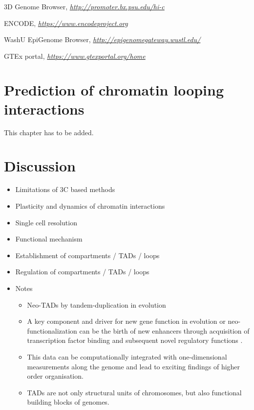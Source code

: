 \documentclass[a4paper,twoside=true,openright,parskip=full,chapterprefix=true,11pt,headings=normal,bibliography=totoc,listof=totoc,titlepage=on,captions=tableabove,draft=false]{scrreprt}
\providecommand{\tightlist}{%
  \setlength{\itemsep}{0pt}\setlength{\parskip}{0pt}}
\theoremstyle{definition}
\theoremstyle{definition}
\theoremstyle{definition}
\theoremstyle{remark}
\begin{document}
3D Genome Browser,
\href{http://promoter.bx.psu.edu/hi-c}{\emph{http://promoter.bx.psu.edu/hi-c}}

ENCODE,
\href{https://www.encodeproject.org/}{\emph{https://www.encodeproject.org}}

WashU EpiGenome Browser,
\href{http://epigenomegateway.wustl.edu/}{\emph{http://epigenomegateway.wustl.edu/}}

GTEx portal,
\href{https://www.gtexportal.org/home}{\emph{https://www.gtexportal.org/home}}

\chapter{Prediction of chromatin looping
interactions}\label{loop-prediction}

This chapter has to be added.

\chapter{Discussion}\label{thesis-discussion}

\begin{itemize}
\item
  Limitations of 3C based methods
\item
  Plasticity and dynamics of chromatin interactions
\item
  Single cell resolution
\item
  Functional mechanism
\item
  Establishment of compartments / TADs / loops
\item
  Regulation of compartments / TADs / loops
\item
  Notes

  \begin{itemize}
  \tightlist
  \item
    Neo-TADs by tandem-duplication in evolution \citep{Franke2016}
  \item
    A key component and driver for new gene function in evolution or
    neo-functionalization can be the birth of new enhancers through
    acquisition of transcription factor binding and subsequent novel
    regulatory functions \citep{Long2016}.
  \item
    This data can be computationally integrated with one-dimensional
    measurements along the genome and lead to exciting findings of
    higher order organisation.
  \item
    TADs are not only structural units of chromosomes, but also
    functional building blocks of genomes.
  \end{itemize}
\end{itemize}
\end{document}
